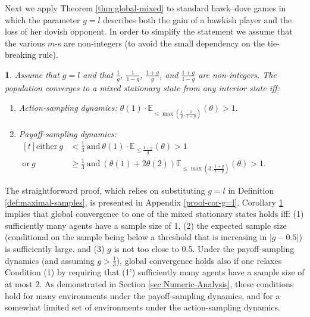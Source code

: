 \documentclass[12pt]{article}
\numberwithin{equation}{section}
\numberwithin{figure}{section}
\theoremstyle{definition}
\theoremstyle{plain}
\theoremstyle{plain}
\theoremstyle{plain}
\theoremstyle{remark}
\theoremstyle{plain}
\theoremstyle{plain}
\newtheorem{cor}{\protect\corollaryname}
\providecommand{\corollaryname}{Corollary}
\begin{document}
Next we apply Theorem \ref{thm:global-mixed} to standard hawk--dove games in which the parameter $g=l$ 
describes both the gain of a hawkish player and the loss of her dovish opponent. 
In order to simplify the statement we assume that the various $m$-s are non-integers (to avoid the small dependency on the tie-breaking rule).
\begin{cor}\label{cor:g=l}
Assume that $g=l$ and that $\frac{1}{g}$, $\frac{1}{1-g}$, $\frac{1+g}{g}$, and $\frac{1+g}{1-g}$ are non-integers. The population converges to a mixed stationary state from any interior state iff:
\begin{enumerate}
    \item Action-sampling dynamics: $\theta(1)\cdot\mathbb{E}_{\leq \max\left(\frac{1}{g},\frac{1}{1-g}\right)}\left(\theta\right)>1.$
    \item Payoff-sampling dynamics: $\begin{aligned}[t]
   \text{either} \ g&<\frac{1}{3} \ \text{and} \ \theta(1)\cdot\mathbb{E}_{\leq \frac{1+g}{g}}\left(\theta\right)>1\\
        \text{or} \ g&\geq\frac{1}{3} \ \text{and}  \ (\theta(1)+2\theta(2))\mathbb{E}_{\leq \max\left(3,\frac{1+g}{1-g}\right)}\left(\theta\right)>1.                      \end{aligned}$
   \end{enumerate}
\end{cor}
The straightforward proof, which relies on substituting $g=l$ in Definition \ref{def:maximal-samples}, is presented in Appendix \ref{proof-cor-g=l}.
Corollary \ref{cor:g=l} implies that global convergence to one of the mixed stationary states holds iff: (1) sufficiently many agents have a sample size of 1, (2) the expected sample size 
(conditional on the sample being below a threshold that is increasing in $|g-0.5|$) is sufficiently large, and (3) $g$  is not too close to 0.5. Under the payoff-sampling dynamics (and assuming $g>\frac{1}{3}$), global convergence holds also if one relaxes Condition (1) by requiring that (1') sufficiently many agents have a sample size of at most 2.
As demonstrated in Section \ref{sec:Numeric-Analysis}, these conditions hold for many environments under the payoff-sampling dynamics, and for a somewhat limited set of environments under the action-sampling dynamics.
\end{document}
